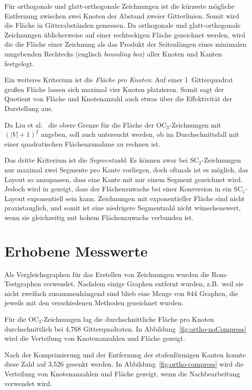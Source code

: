 \documentclass[a4paper]{scrreprt}
\theoremstyle{definition}
\begin{document}
Für orthogonale und glatt-orthogonale Zeichnungen ist die kürzeste mögliche Entfernung zwischen zwei Knoten der Abstand zweier Gitterlinien. Somit wird die Fläche in Gitterabständen gemessen. Da orthogonale und glatt-orthogonale Zeichnungen üblicherweise auf einer rechteckigen Fläche gezeichnet werden, wird die die Fläche einer Zeichnung als das Produkt der Seitenlängen eines minimalen umgebenden Rechtecks (englisch \emph{bounding box}) aller Knoten und Kanten festgelegt.

Ein weiteres Kriterium ist die \emph{Fläche pro Knoten}: Auf einer 1~Gitterquadrat großen Fläche lassen sich maximal vier Knoten platzieren. Somit sagt der Quotient von Fläche und Knotenanzahl auch etwas über die Effektivität der Darstellung aus.

Da Liu et al.~\cite{liu+etal-98} die obere Grenze für die Fläche der OC$_3$-Zeichnungen mit $(|V|+1)^2$ angeben, soll auch untersucht werden, ob im Durchschnittsfall mit einer quadratischen Flächenzunahme zu rechnen ist.

Das dritte Kriterium ist die \emph{Segmentzahl}: Es können zwar bei SC$_2$-Zeichnungen nur maximal zwei Segmente pro Kante vorliegen, doch oftmals ist es möglich, das Layout so anzupassen, dass eine Kante mit nur einem Segment gezeichnet wird.  Jedoch wird in \cite{bekos-13} gezeigt, dass der Flächenzuwachs bei einer Konversion in ein SC$_1$-Layout exponentiell sein kann. Zeichnungen mit exponentieller Fläche sind nicht praxistauglich, und somit ist eine niedrigere Segmentzahl nicht wünschenswert, wenn sie gleichzeitig mit hohem Flächenzuwachs verbunden ist.

\section{Erhobene Messwerte}

Als Vergleichsgraphen für das Erstellen von Zeichnungen wurden die Rom-Testgraphen verwendet. Nachdem einige Graphen entfernt wurden, z.B.\ weil sie nicht zweifach zusammenhängend sind blieb eine Menge von 844 Graphen, die jeweils mit den verschiedenen Methoden gezeichnet wurden.%

Für die OC$_3$-Zeichnungen lag die durchschnittliche Fläche pro Knoten durchschnittlich bei 4,768 Gitterquadraten. In Abbildung~\ref{fig:ortho-noCompress} wird die Verteilung von Knotenanzahlen und Fläche gezeigt.

Nach der Komprimierung und der Entfernung der stufenförmigen Kanten konnte diese Zahl auf 3,526 gesenkt werden. In Abbildung~\ref{fig:ortho-compress} wird die Verteilung von Knotenanzahlen und Fläche gezeigt, wenn die Nachbearbeitung verwendet wird.
\end{document}
